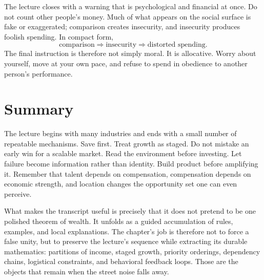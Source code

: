 The lecture closes with a warning that is psychological and financial at once. Do not count other people's money. Much of what appears on the social surface is fake or exaggerated; comparison creates insecurity, and insecurity produces foolish spending. In compact form,
\begin{equation}
\text{comparison} \Rightarrow \text{insecurity} \Rightarrow \text{distorted spending}.
\end{equation}
The final instruction is therefore not simply moral. It is allocative. Worry about yourself, move at your own pace, and refuse to spend in obedience to another person's performance.

\section{Summary}

The lecture begins with many industries and ends with a small number of repeatable mechanisms. Save first. Treat growth as staged. Do not mistake an early win for a scalable market. Read the environment before investing. Let failure become information rather than identity. Build product before amplifying it. Remember that talent depends on compensation, compensation depends on economic strength, and location changes the opportunity set one can even perceive.

What makes the transcript useful is precisely that it does not pretend to be one polished theorem of wealth. It unfolds as a guided accumulation of rules, examples, and local explanations. The chapter's job is therefore not to force a false unity, but to preserve the lecture's sequence while extracting its durable mathematics: partitions of income, staged growth, priority orderings, dependency chains, logistical constraints, and behavioral feedback loops. Those are the objects that remain when the street noise falls away.